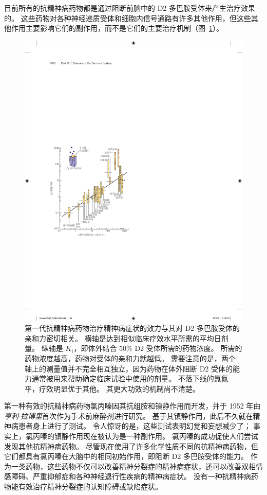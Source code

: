 目前所有的抗精神病药物都是通过阻断前脑中的 D2 多巴胺受体来产生治疗效果的。
这些药物对各种神经递质受体和细胞内信号通路有许多其他作用，但这些其他作用主要影响它们的副作用，而不是它们的主要治疗机制（图~\ref{fig:60_8}）。


\begin{figure}[htbp]
	\centering
	\includegraphics[width=0.67\linewidth]{chap60/fig_60_8}
	\caption{第一代抗精神病药物治疗精神病症状的效力与其对 D2 多巴胺受体的亲和力密切相关。
		横轴是达到相似临床疗效水平所需的平均日剂量。
		纵轴是 $ K_i $，即体外结合 50\% D2 受体所需的药物浓度。
		所需的药物浓度越高，药物对受体的亲和力就越低。
		需要注意的是，两个轴上的测量值并不完全相互独立，因为药物在体外阻断 D2 受体的能力通常被用来帮助确定临床试验中使用的剂量。
		不落下线的氯氮平，疗效明显优于其他。 其更大功效的机制尚不清楚\cite{seeman1976antipsychotic}。}
	\label{fig:60_8}
\end{figure}


第一种有效的抗精神病药物氯丙嗪因其抗组胺和镇静作用而开发，并于 1952 年由\textit{亨利$\cdot$拉博里}首次作为手术前麻醉剂进行研究。
基于其镇静作用，此后不久就在精神病患者身上进行了测试。
令人惊讶的是，这些测试表明幻觉和妄想减少了；
事实上，氯丙嗪的镇静作用现在被认为是一种副作用。
氯丙嗪的成功促使人们尝试发现其他抗精神病药物。
尽管现在使用了许多化学性质不同的抗精神病药物，但它们都具有氯丙嗪在大脑中的相同初始作用，即阻断 D2 多巴胺受体的能力。
作为一类药物，这些药物不仅可以改善精神分裂症的精神病症状，还可以改善双相情感障碍、严重抑郁症和各种神经退行性疾病的精神病症状。
没有一种抗精神病药物能有效治疗精神分裂症的认知障碍或缺陷症状。


